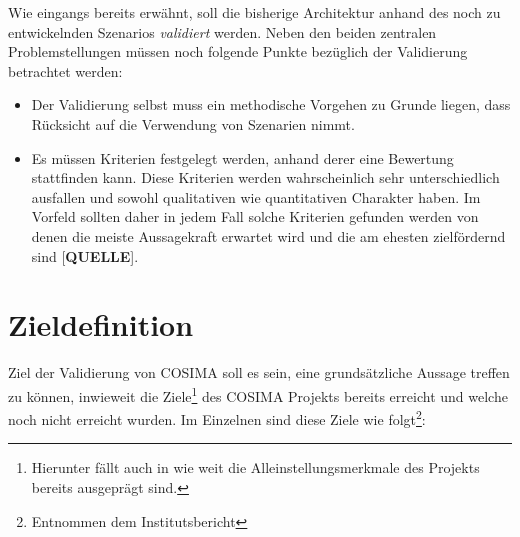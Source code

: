   Wie eingangs bereits erwähnt, soll die bisherige Architektur anhand des noch zu entwickelnden Szenarios \emph{validiert} werden. Neben den beiden zentralen Problemstellungen müssen noch folgende Punkte bezüglich der Validierung betrachtet werden:

  \begin{itemize}
    \item Der Validierung selbst muss ein methodische Vorgehen zu Grunde liegen, dass Rücksicht auf die Verwendung von Szenarien nimmt.
    \item Es müssen Kriterien festgelegt werden, anhand derer eine Bewertung stattfinden kann. Diese Kriterien werden wahrscheinlich sehr unterschiedlich ausfallen und sowohl qualitativen wie quantitativen Charakter haben. Im Vorfeld sollten daher in jedem Fall solche Kriterien gefunden werden von denen die meiste Aussagekraft erwartet wird und die am ehesten zielfördernd sind [\textbf{QUELLE}].
  \end{itemize}


\section{Zieldefinition} %
\label{sec:zieldefinition}

  Ziel der Validierung von COSIMA soll es sein, eine grundsätzliche Aussage treffen zu können, inwieweit die Ziele\footnote{Hierunter fällt auch in wie weit die Alleinstellungsmerkmale des Projekts bereits ausgeprägt sind.} des COSIMA Projekts bereits erreicht und welche noch nicht erreicht wurden. Im Einzelnen sind diese Ziele wie folgt\footnote{Entnommen dem Institutsbericht}:
  
